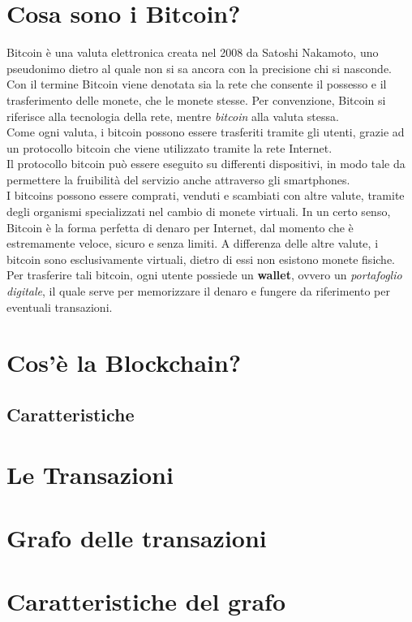 \section{Cosa sono i Bitcoin?}

Bitcoin è una valuta elettronica creata nel 2008 da Satoshi Nakamoto, uno pseudonimo dietro al quale non si sa ancora con la precisione chi si nasconde.
Con il termine Bitcoin viene denotata sia la rete che consente il possesso e il trasferimento delle monete, che le monete stesse. Per convenzione, Bitcoin si riferisce alla tecnologia della rete, mentre \textit{bitcoin} alla valuta stessa.\\
Come ogni valuta, i bitcoin possono essere trasferiti tramite gli utenti, grazie ad un protocollo bitcoin che viene utilizzato tramite la rete Internet. \\ Il protocollo bitcoin può essere eseguito su differenti dispositivi, in modo tale da permettere la fruibilità del servizio anche attraverso gli smartphones.\\
I bitcoins possono essere comprati, venduti e scambiati con altre valute, tramite degli organismi specializzati nel cambio di monete virtuali. In un certo senso, Bitcoin è la forma perfetta di denaro per Internet, dal momento che è estremamente veloce, sicuro e senza limiti.
A differenza delle altre valute, i bitcoin sono esclusivamente virtuali, dietro di essi non esistono monete fisiche.\\ Per trasferire tali bitcoin, ogni utente possiede un \textbf{wallet}, ovvero un \textit{portafoglio digitale}, il quale serve per memorizzare il denaro e fungere da riferimento per eventuali transazioni.

\section{Cos'è la Blockchain?}
\subsection{Caratteristiche}
\section{Le Transazioni}
\section{Grafo delle transazioni}
\section{Caratteristiche del grafo}